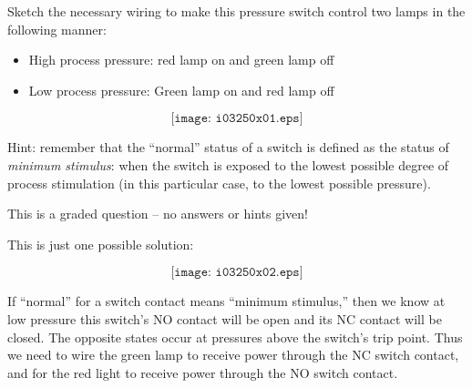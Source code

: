 

Sketch the necessary wiring to make this pressure switch control two lamps in the following manner:

\begin{itemize}
\item{} High process pressure: red lamp on and green lamp off
\item{} Low process pressure: Green lamp on and red lamp off
\end{itemize}

$$\texttt{[image: i03250x01.eps]}$$

\vfil 

Hint: remember that the ``normal'' status of a switch is defined as the status of {\it minimum stimulus}: when the switch is exposed to the lowest possible degree of process stimulation (in this particular case, to the lowest possible pressure).

\eject






This is a graded question -- no answers or hints given!
 






This is just one possible solution:

$$\texttt{[image: i03250x02.eps]}$$

If ``normal'' for a switch contact means ``minimum stimulus,'' then we know at low pressure this switch's NO contact will be open and its NC contact will be closed.  The opposite states occur at pressures above the switch's trip point.  Thus we need to wire the green lamp to receive power through the NC switch contact, and for the red light to receive power through the NO switch contact.




